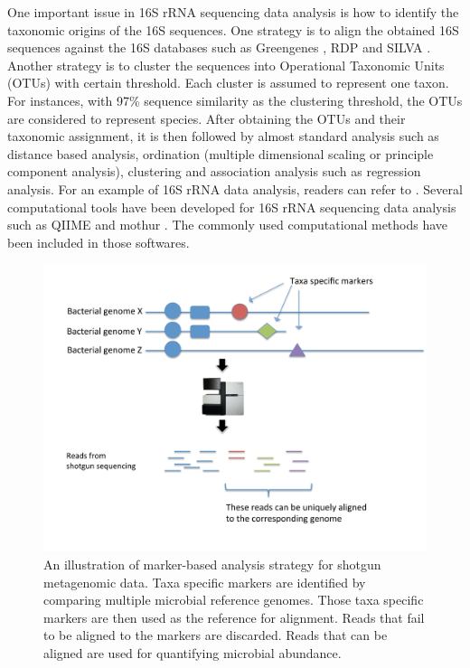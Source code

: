 One important issue in 16S rRNA sequencing data analysis is how to identify the taxonomic origins of the 16S sequences. One strategy  is to align the obtained 16S sequences against the 16S databases such as Greengenes \citep{DeSantis:2006ii}, RDP \citep{Cole:2014jw} and SILVA \citep{Quast:2013hk}. Another strategy is to cluster the sequences into Operational Taxonomic Units (OTUs) with certain threshold. Each cluster is assumed to represent one taxon. For instances, with 97\% sequence similarity as the clustering threshold, the OTUs are considered to represent species.  After obtaining the OTUs and their taxonomic assignment, it is then followed by almost standard analysis such as distance based analysis, ordination (multiple dimensional scaling or principle component analysis), clustering and association analysis such as regression analysis. For an example of 16S rRNA data analysis, readers can refer to \citet{wu2011linking}. Several computational tools have been developed for 16S rRNA sequencing data analysis such as QIIME \citep{Caporaso:2010jf} and mothur \citep{Schloss:2009do}. The commonly used computational methods have been included in those softwares.



\begin{figure}[p]
	\begin{center}
		\includegraphics[scale=0.55,trim=0 0 0 0,clip]{Figure/F11_MetaPhlAn.pdf}
		\caption[An illustration of marker-based analysis strategy  for shotgun metagenomic data]{An illustration of marker-based analysis strategy  for shotgun metagenomic data. Taxa specific markers are identified by comparing multiple microbial reference genomes. Those taxa specific markers are then used as the reference for alignment. Reads that fail to be aligned to the markers are discarded. Reads that can be aligned are used for quantifying microbial abundance.} \label{F11_MetaPhlAn}
	\end{center}
\end{figure}


